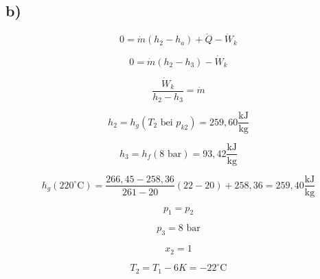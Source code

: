 

\subsection*{b)}

\[
0 = \dot{m} (h_2 - h_a) + \dot{Q} - \dot{W}_k
\]

\[
0 = \dot{m} (h_2 - h_3) - \dot{W}_k
\]

\[
\frac{\dot{W}_k}{h_2 - h_3} = \dot{m}
\]

\[
h_2 = h_g \left( T_2 \text{ bei } p_{k2} \right) = 259,60 \frac{\text{kJ}}{\text{kg}}
\]

\[
h_3 = h_f \left( 8 \text{ bar} \right) = 93,42 \frac{\text{kJ}}{\text{kg}}
\]

\[
h_g (220^\circ \text{C}) = \frac{266,45 - 258,36}{261 - 20} (22 - 20) + 258,36 = 259,40 \frac{\text{kJ}}{\text{kg}}
\]

\[
p_1 = p_2
\]

\[
p_3 = 8 \text{ bar}
\]

\[
x_2 = 1
\]

\[
T_2 = T_1 - 6K = -22^\circ \text{C}
\]